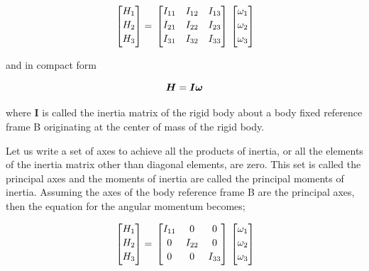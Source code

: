 \begin{equation}{\label{eqn:angularMomentumInMatrixForm}}
\begin{bmatrix}
H_1\\[0.2em]
H_2\\[0.2em]
H_3\\[0.2em]
\end{bmatrix}
 =\,
\begin{bmatrix}
I_{11} & I_{12} & I_{13} \\[0.2em]
I_{21} & I_{22} & I_{23} \\[0.2em]
I_{31} & I_{32} &I_{33} \\[0.2em]
\end{bmatrix}
\,
\begin{bmatrix}
\omega_1\\[0.2em]
\omega_2\\[0.2em]
\omega_3\\[0.2em]
\end{bmatrix}
\end{equation}

and in compact form

\begin{equation}{\label{eqn:angMomentumComp2}}
\bm{H} = \bm{I} \bm{\omega}
\end{equation}

where $\bm{I}$  is called the inertia matrix of the rigid body about a body fixed reference frame B originating at the center of mass of the rigid body.

Let us write a set of axes to achieve all the products of inertia, or all the elements of the inertia matrix other than diagonal elements, are zero. 
This set is called the principal axes and the moments of inertia are called the principal moments of inertia. 
Assuming the axes of the body reference frame B are the principal axes, then the equation for the angular momentum becomes;

\begin{equation}{\label{eqn:angularMomentumInPrincipleAxes}}
\begin{bmatrix}
H_1\\[0.2em]
H_2\\[0.2em]
H_3\\[0.2em]
\end{bmatrix}
 =\,
\begin{bmatrix}
I_{11} & 0 & 0 \\[0.2em]
0 & I_{22} & 0 \\[0.2em]
0 & 0 &I_{33} \\[0.2em]
\end{bmatrix}
\,
\begin{bmatrix}
\omega_1\\[0.2em]
\omega_2\\[0.2em]
\omega_3\\[0.2em]
\end{bmatrix}
\end{equation}

